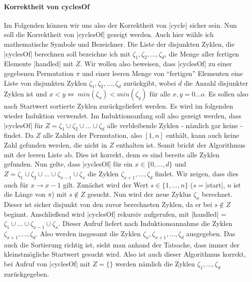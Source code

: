 \paragraph{Korrektheit von cyclesOf}
Im Folgenden können wir uns also der Korrektheit von |cycle| sicher sein. Nun soll die Korrektheit von |cyclesOf| gezeigt werden.
Auch hier wähle ich mathematische Symbole und Bezeichner.
Die Liste der disjunkten Zyklen, die |cyclesOf| berechnen soll bezeichne ich mit $\zeta_1, \zeta_2, \dots, \zeta_d$, die Menge aller fertigen Elemente |handled| mit $Z$.
Wir wollen also beweisen, dass |cyclesOf| zu einer gegebenen Permutation $\pi$ und einer leeren Menge von ``fertigen'' Elementen eine Liste
von disjunkten Zyklen $\zeta_1, \zeta_2, \dots, \zeta_d$ zurückgibt, wobei $d$ die Anzahl disjunkter Zyklen ist und $x < y \Leftrightarrow \ min(\zeta_x) < min(\zeta_y)$ für alle $x,y=0 \dots o$.
Es sollen also nach Startwert sortierte Zyklen zurückgeliefert werden.
Es wird im folgenden wieder Induktion verwendet.
Im Induktionsanfang soll also gezeigt werden, dass |cyclesOf| für $Z = \zeta_1 \cup \zeta_2 \cup \dots \cup \zeta_d$ alle verbleibende Zyklen - nämlich gar keine - findet.
Da $Z$ alle Zahlen der Permutation, also $[1,n]$ enthält, kann auch keine Zahl gefunden werden, die nicht in $Z$ enthalten ist. Somit bricht der Algorithmus mit der leeren Liste ab.
Dies ist korrekt, denn es sind bereits alle Zyklen gefunden.
Nun gelte, dass |cyclesOf| für ein $x \in \{0, \dots, d\}$ und $Z = \zeta_1 \cup \zeta_2 \cup \dots \cup \zeta_{x-1} \cup \zeta_x$ die Zyklen $\zeta_{x+1}, \dots, \zeta_d$ findet.
Wir zeigen, dass dies auch für $x \rightarrow x-1$ gilt.
Zunächst wird der Wert $s \in \{1, \dots, n\}$ ($s=$|start|, $n$ ist die Länge von $\pi$) mit $s \notin Z$ gesucht.
Nun wird der neue Zyklus $\zeta_x$ berechnet. Dieser ist sicher disjunkt von den zuvor berechneten Zyklen, da er bei $s \notin Z$ beginnt.
Anschließend wird |cyclesOf| rekursiv aufgerufen, mit |handled| = $\zeta_1 \cup \dots \cup \zeta_{x-1} \cup \zeta_{x}$.
Dieser Aufruf liefert nach Induktionsannahme die Zyklen $\zeta_{x+1}, \dots, \zeta_d$.
Also werden insgesamt die Zyklen $\zeta_{x}, \zeta_{x+1}, \dots, \zeta_d$ ausgegeben.
Das auch die Sortierung richtig ist, sieht man anhand der Tatsache, dass immer der kleinstmögliche Startwert gesucht wird.
Also ist auch dieser Algorithmus korrekt, bei Aufruf von |cyclesOf| mit $Z = \{\}$ werden nämlich die Zyklen $\zeta_1, \dots, \zeta_d$ zurückgegeben.
